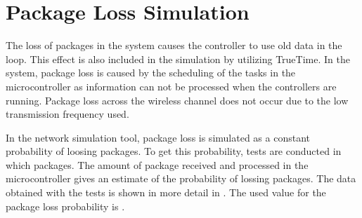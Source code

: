 \section{Package Loss Simulation}
The loss of packages in the system causes the controller to use old data in the loop. This effect is also included in the simulation by utilizing TrueTime. In the system, package loss is caused by the scheduling of the tasks in the microcontroller as information can not be processed when the controllers are running. Package loss across the wireless channel does not occur due to the low transmission frequency used. 

In the network simulation tool, package loss is simulated as a constant probability of loosing packages. To get this probability, tests are conducted in which  packages. The amount of package received and processed in the microcontroller gives an estimate of the probability of lossing packages. The data obtained with the tests is shown in more detail in . The used value for the package loss probability is .